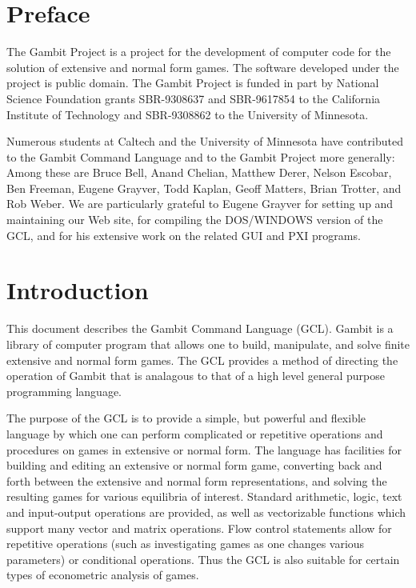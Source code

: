 \tableofcontents

\chapter*{Preface}
\pagestyle{myheadings}

The Gambit Project is a project for the development of computer code
for the solution of extensive and normal form games.  The software
developed under the project is public domain.  The Gambit Project is
funded in part by National Science Foundation grants SBR-9308637 and
SBR-9617854 to the California Institute of Technology and SBR-9308862
to the University of Minnesota.

Numerous students at Caltech and the University of Minnesota have
contributed to the Gambit Command Language and to the Gambit Project
more generally: Among these are Bruce Bell, Anand Chelian, Matthew
Derer, Nelson Escobar, Ben Freeman, Eugene Grayver, Todd Kaplan, Geoff
Matters, Brian Trotter, and Rob Weber. We are particularly grateful to
Eugene Grayver for setting up and maintaining our Web site, for
compiling the DOS/WINDOWS version of the GCL, and for his extensive
work on the related GUI and PXI programs.

\chapter{Introduction}
\pagestyle{headings}

This document describes the Gambit Command Language (GCL).  Gambit is
a library of computer program that allows one to build, manipulate,
and solve finite extensive and normal form games. The GCL provides a
method of directing the operation of Gambit that is analagous to that
of a high level general purpose programming language.

The purpose of the GCL is to provide a simple, but powerful and
flexible language by which one can perform complicated or repetitive
operations and procedures on games in extensive or normal form.  The
language has facilities for building and editing an extensive or
normal form game, converting back and forth between the extensive and
normal form representations, and solving the resulting games for
various equilibria of interest.  Standard arithmetic, logic, text and
input-output operations are provided, as well as vectorizable
functions which support many vector and matrix operations.  Flow
control statements allow for repetitive operations (such as
investigating games as one changes various parameters) or conditional
operations.  Thus the GCL is also suitable for certain types of
econometric analysis of games.


